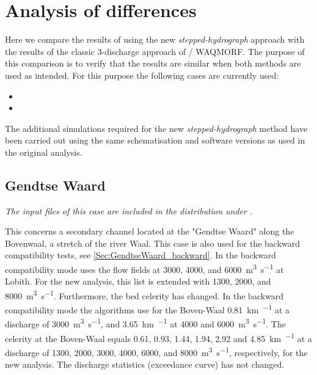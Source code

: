 \chapter{Analysis of differences} \label{Chp:Verschil}

Here we compare the results of \dfastmi using the new \emph{stepped-hydrograph} approach with the results of the classic 3-discharge approach of  / WAQMORF.
The purpose of this comparison is to verify that the results are similar when both methods are used as intended.
For this purpose the following cases are currently used:

\begin{itemize}
\item {}
\item {}
\end{itemize}

The additional simulations required for the new \emph{stepped-hydrograph} method have been carried out using the same schematisation and software versions as used in the original analysis.



\section{Gendtse Waard}\label{Sec:GendtseWaard}

\emph{The input files of this case are included in the distribution under .}

This concerns a secondary channel located at the "Gendtse Waard" along the Bovenwaal, a stretch of the river Waal.
This case is also used for the backward compatibility tests, see \autoref{Sec:GendtseWaard_backward}.
In the backward compatibility mode \dfmi uses the flow fields at 3000, 4000, and \SI{6000}{\metre\cubed\per\second} at Lobith.
For the new analysis, this list is extended with 1300, 2000, and \SI{8000}{\metre\cubed\per\second}.
Furthermore, the bed celerity has changed.
In the backward compatibility mode the algorithms use for the Boven-Waal \SI{0.81}{\kilo\metre\per\year} at a discharge of \SI{3000}{\metre\cubed\per\second}, and \SI{3.65}{\kilo\metre\per\year} at 4000 and \SI{6000}{\metre\cubed\per\second}.
The celerity at the Boven-Waal equals 0.61, 0.93, 1.44, 1.94, 2.92 and \SI{4.85}{\kilo\metre\per\year} at a discharge of 1300, 2000, 3000, 4000, 6000, and \SI{8000}{\metre\cubed\per\second}, respectively, for the new analysis.
The discharge statistics (exceedance curve) has not changed.

